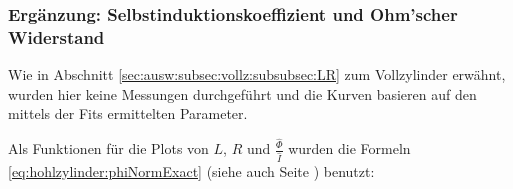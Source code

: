 






\clearpage
\subsubsection{Erg\"anzung: Selbstinduktionskoeffizient und Ohm'scher Widerstand}
\label{sec:ausw:subsec:hohlz:st:subsubsec:LR}

Wie  in  Abschnitt \ref{sec:ausw:subsec:vollz:subsubsec:LR}  zum  Vollzylinder
erw\"ahnt, wurden hier keine Messungen  durchgef\"uhrt und die Kurven basieren
auf den mittels der Fits ermittelten Parameter.

Als Funktionen f\"ur  die Plots von $L$,  $R$ und $\frac{\hat{\Phi}}{\hat{I}}$
wurden  die  Formeln   \ref{eq:hohlzylinder:phiNormExact}  (siehe  auch  Seite
\pageref{eq:hohlzylinder:phiNormExact}) benutzt:


